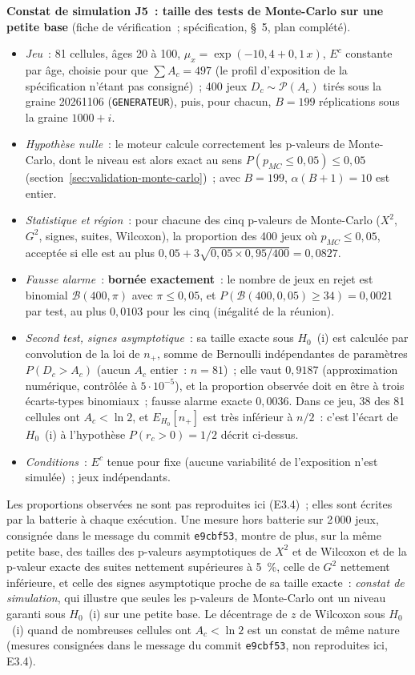 \documentclass[a4paper,11pt]{article}
\newcommand{\code}[1]{\texttt{\small #1}}
\begin{document}
\medskip
\noindent
\textbf{Constat de simulation J5~: taille des tests de Monte-Carlo sur une
petite base} (fiche de vérification~; spécification, §~5, plan complété).
\begin{itemize}[leftmargin=*, itemsep=2pt]
  \item \emph{Jeu}~: 81 cellules, âges 20 à 100, $\mu_x = \exp(-10{,}4 +
    0{,}1\,x)$, $E^c$ constante par âge, choisie pour que $\sum A_c = 497$
    (le profil d'exposition de la spécification n'étant pas consigné)~;
    400 jeux $D_c \sim \mathcal{P}(A_c)$ tirés sous la graine 20261106
    (\code{GENERATEUR}), puis, pour chacun, $B = 199$ réplications sous la
    graine $1000 + i$.
  \item \emph{Hypothèse nulle}~: le moteur calcule correctement les
    p-valeurs de Monte-Carlo, dont le niveau est alors exact au sens
    $P(p_{MC} \le 0{,}05) \le 0{,}05$ (section~\ref{sec:validation-monte-carlo})~;
    avec $B = 199$, $\alpha(B+1) = 10$ est entier.
  \item \emph{Statistique et région}~: pour chacune des cinq p-valeurs de
    Monte-Carlo ($X^2$, $G^2$, signes, suites, Wilcoxon), la proportion des
    400 jeux où $p_{MC} \le 0{,}05$, acceptée si elle est au plus $0{,}05 +
    3\sqrt{0{,}05 \times 0{,}95 / 400} = 0{,}0827$.
  \item \emph{Fausse alarme}~: \textbf{bornée exactement}~: le nombre de
    jeux en rejet est binomial $\mathcal{B}(400, \pi)$ avec $\pi \le
    0{,}05$, et $P(\mathcal{B}(400, 0{,}05) \ge 34) = 0{,}0021$ par test,
    au plus $0{,}0103$ pour les cinq (inégalité de la réunion).
  \item \emph{Second test, signes asymptotique}~: sa taille exacte sous
    $H_0$~(i) est calculée par convolution de la loi de $n_{+}$, somme de
    Bernoulli indépendantes de paramètres $P(D_c > A_c)$ (aucun $A_c$
    entier~: $n = 81$)~; elle vaut $0{,}9187$ (approximation numérique,
    contrôlée à $5 \cdot 10^{-5}$), et la proportion observée doit en être
    à trois écarts-types binomiaux~; fausse alarme exacte $0{,}0036$. Dans
    ce jeu, 38 des 81 cellules ont $A_c < \ln 2$, et $E_{H_0}[n_{+}]$ est
    très inférieur à $n/2$~: c'est l'écart de $H_0$~(i) à l'hypothèse
    $P(r_c > 0) = 1/2$ décrit ci-dessus.
  \item \emph{Conditions}~: $E^c$ tenue pour fixe (aucune variabilité de
    l'exposition n'est simulée)~; jeux indépendants.
\end{itemize}
Les proportions observées ne sont pas reproduites ici (E3.4)~; elles
sont écrites par la batterie à chaque exécution. Une mesure hors batterie
sur 2\,000 jeux, consignée dans le message du commit \code{e9cbf53}, montre
de plus, sur la même petite base, des tailles des p-valeurs asymptotiques
de $X^2$ et de Wilcoxon et de la p-valeur exacte des suites nettement
supérieures à 5~\%, celle de $G^2$ nettement inférieure, et celle des signes
asymptotique proche de sa taille exacte~: \emph{constat de simulation}, qui
illustre que seules les p-valeurs de Monte-Carlo ont un niveau garanti sous
$H_0$~(i) sur une petite base. Le décentrage de $z$ de Wilcoxon sous
$H_0$~(i) quand de nombreuses cellules ont $A_c < \ln 2$ est un constat de
même nature (mesures consignées dans le message du commit \code{e9cbf53}, non
reproduites ici, E3.4).
\end{document}
